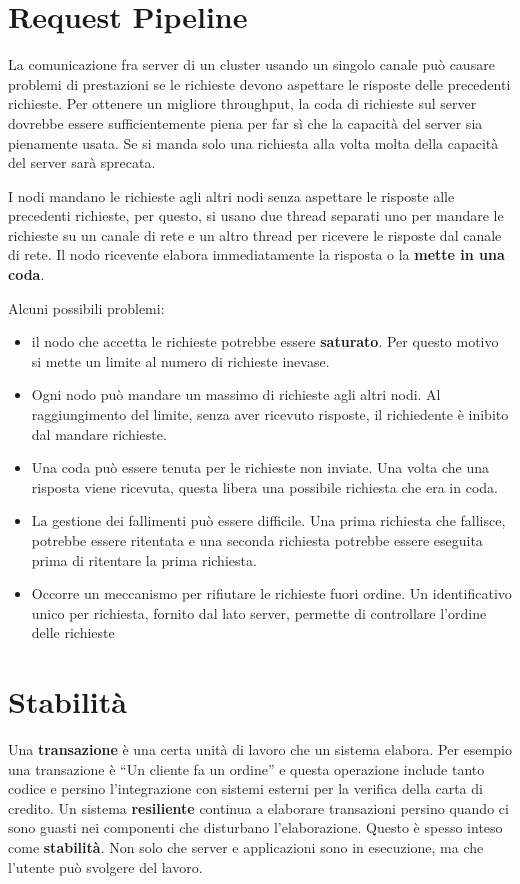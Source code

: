 \section{Request Pipeline}
La comunicazione fra server di un cluster usando un singolo canale può causare problemi di prestazioni se le richieste devono aspettare le risposte delle precedenti richieste.  Per ottenere un migliore throughput, la coda di richieste sul server dovrebbe essere sufficientemente piena per far sì che la capacità del server sia pienamente usata. Se si manda solo una richiesta alla volta molta della capacità del server sarà sprecata.

I nodi mandano le richieste agli altri nodi senza aspettare le risposte alle precedenti richieste, per questo, si usano due thread separati uno per mandare le richieste su un canale di rete e un altro thread per
ricevere le risposte dal canale di rete. Il nodo ricevente elabora immediatamente la risposta o la \textbf{mette in una coda}.

Alcuni possibili problemi:
\begin{itemize}
    \item il nodo che accetta le richieste potrebbe essere \textbf{saturato}. Per questo motivo si mette un limite al numero di richieste inevase.
    \item Ogni nodo può mandare un massimo di richieste agli altri nodi. Al raggiungimento del limite, senza aver ricevuto risposte, il richiedente è inibito dal mandare richieste.
    \item Una coda può essere tenuta per le richieste non inviate. Una volta che una risposta viene ricevuta, questa libera una possibile richiesta che era in coda.
    \item La gestione dei fallimenti può essere difficile. Una prima richiesta che fallisce, potrebbe essere ritentata e una seconda richiesta potrebbe essere eseguita prima di ritentare la prima richiesta.
    \item Occorre un meccanismo per rifiutare le richieste fuori ordine. Un identificativo unico per richiesta, fornito dal lato server, permette di controllare l’ordine delle richieste
\end{itemize}
 

\section{Stabilità}
Una \textbf{transazione} è una certa unità di lavoro che un sistema elabora. Per esempio una transazione è “Un cliente fa un ordine” e questa operazione include tanto codice e persino l’integrazione con sistemi esterni per la verifica della carta di credito. Un sistema \textbf{resiliente} continua a elaborare transazioni persino quando ci sono guasti nei componenti che disturbano l’elaborazione. Questo è spesso inteso come \textbf{stabilità}. Non solo che server e applicazioni sono in esecuzione, ma che l’utente può svolgere del lavoro. 


